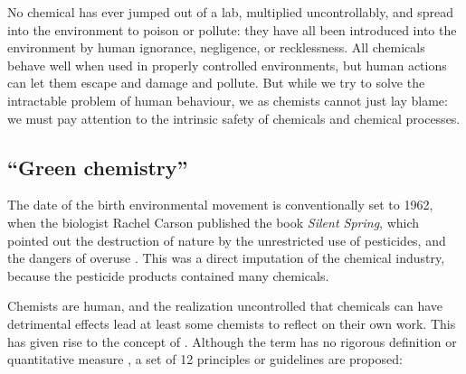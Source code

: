 No chemical has ever jumped out of a lab, multiplied uncontrollably, and spread
into the environment to poison or pollute: they have all been introduced into
the environment by human ignorance, negligence, or recklessness. All chemicals
behave well when used in properly controlled environments, but human actions can
let them escape and damage and pollute. But while we try to solve the
intractable problem of human behaviour, we as chemists cannot just lay blame: we
must pay attention to the intrinsic safety of chemicals and chemical processes.
 
\subsection{``Green chemistry''}
\label{sec:GreenChemistry}
The date of the birth environmental movement is conventionally set to 1962, when
the biologist Rachel Carson published the book \textit{Silent Spring}, which
pointed out the destruction of nature by the unrestricted use of pesticides, and
the dangers of overuse \autocite{Carson1962}. This was a direct imputation of
the chemical industry, because the pesticide products contained many chemicals.

Chemists are human, and the realization uncontrolled that chemicals can have
detrimental effects lead at least some chemists to reflect on their own work.
This has given rise to the concept of . Although the
term has no rigorous definition or quantitative measure \autocite{Linthorst2010},
a set of 12 principles or guidelines are proposed:


